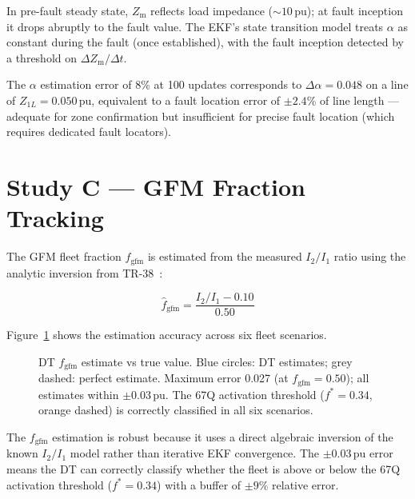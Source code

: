 \documentclass[11pt,a4paper]{article}
\begin{document}
In pre-fault steady state, $Z_\mathrm{m}$ reflects load impedance ($\sim10$\,pu);
at fault inception it drops abruptly to the fault value.  The EKF's state
transition model treats $\alpha$ as constant during the fault (once established),
with the fault inception detected by a threshold on $\Delta Z_\mathrm{m}/\Delta t$.

The $\alpha$ estimation error of 8\% at 100 updates corresponds to
$\Delta\alpha = 0.048$ on a line of $Z_{1L}=0.050$\,pu, equivalent to a fault
location error of $\pm2.4$\% of line length --- adequate for zone confirmation
but insufficient for precise fault location (which requires dedicated fault
locators).

\section{Study C --- GFM Fraction Tracking}
\label{sec:studyC}

The GFM fleet fraction $f_\mathrm{gfm}$ is estimated from the measured
$I_2/I_1$ ratio using the analytic inversion from TR-38~\cite{SAMBP_TR38}:

\begin{equation}
  \hat{f}_\mathrm{gfm} = \frac{I_2/I_1 - 0.10}{0.50}
\end{equation}

Figure~\ref{fig:fgfm} shows the estimation accuracy across six fleet scenarios.

\begin{figure}[htbp]
  \centering
  \resizebox{0.88\textwidth}{!}{}
  \caption{DT $f_\mathrm{gfm}$ estimate vs true value.  Blue circles: DT
           estimates; grey dashed: perfect estimate.  Maximum error 0.027
           (at $f_\mathrm{gfm}=0.50$); all estimates within $\pm0.03$\,pu.
           The 67Q activation threshold ($f^*=0.34$, orange dashed) is
           correctly classified in all six scenarios.}
  \label{fig:fgfm}
\end{figure}

\noindent
The $f_\mathrm{gfm}$ estimation is robust because it uses a direct algebraic
inversion of the known $I_2/I_1$ model rather than iterative EKF convergence.
The $\pm0.03$\,pu error means the DT can correctly classify whether the fleet
is above or below the 67Q activation threshold ($f^*=0.34$) with a buffer of
$\pm9\%$ relative error.

\end{document}
